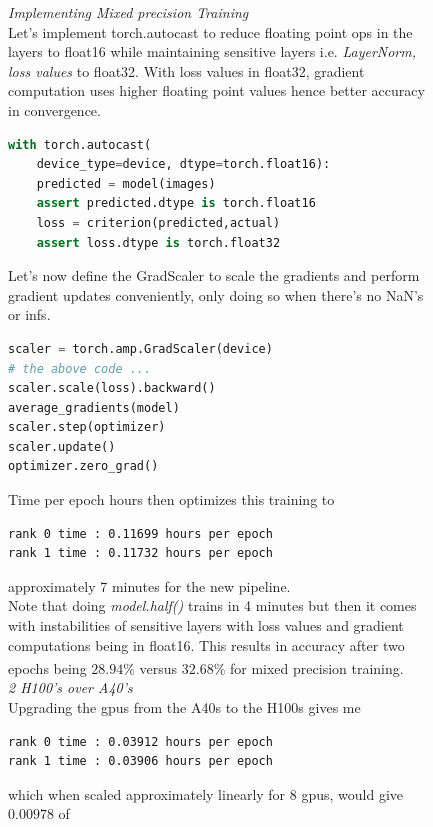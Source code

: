 \documentclass[12pt]{article}
\newcommand{\customtext}[3]{%
    \vspace{#2} %
    \fontsize{13}{8}\textcolor{#1}{\textit{#3}}%
}
\newcommand{\sidecite}[1]{\textsuperscript{\textcolor{blue}{\textbf{\scriptsize#1}}}}
\newcommand{\maincitecount}{\sidecite{\stepcounter{maincite}\themaincite}}
\begin{document}
\begin{figure}[!htb]
    \begin{minipage}[t]{0.65\textwidth}
    \customtext{xtitle}{0em}{Implementing Mixed precision Training}\\
    Let's implement {torch.autocast} to reduce floating point ops in the layers 
    to float16 while maintaining sensitive layers i.e. {\it LayerNorm, loss values} 
    to float32. With loss values in float32, gradient computation uses higher floating 
    point values hence better accuracy in convergence.
\begin{lstlisting}[language=python,style=python,basicstyle=\ttfamily\footnotesize]
with torch.autocast(
    device_type=device, dtype=torch.float16):
    predicted = model(images)
    assert predicted.dtype is torch.float16
    loss = criterion(predicted,actual)
    assert loss.dtype is torch.float32
\end{lstlisting}
Let's now define the GradScaler to scale the gradients and perform gradient updates 
conveniently, only doing so when there's no NaN's or infs.
\begin{lstlisting}[language=python,style=python,basicstyle=\ttfamily\footnotesize]
scaler = torch.amp.GradScaler(device)
# the above code ... 
scaler.scale(loss).backward()
average_gradients(model)
scaler.step(optimizer)
scaler.update()
optimizer.zero_grad()
\end{lstlisting}
Time per epoch hours then optimizes this training to 
\begin{lstlisting}[language=bash,style=bash,basicstyle=\ttfamily\footnotesize]
rank 0 time : 0.11699 hours per epoch
rank 1 time : 0.11732 hours per epoch
\end{lstlisting}
approximately 7 minutes for the new pipeline.\\
Note that doing {\it model.half()} trains in 4 minutes but then it comes with instabilities 
of sensitive layers with loss values and gradient computations being in float16. This results 
in accuracy after two epochs being $28.94 \%$ versus $32.68\%$ for mixed precision 
training.\maincitecount\\
\customtext{xtitle}{0em}{2 H100's over A40's}\\
Upgrading the gpus from the A40s to the H100s gives me 
\begin{lstlisting}[language=bash,style=bash,basicstyle=\ttfamily\footnotesize]
rank 0 time : 0.03912 hours per epoch
rank 1 time : 0.03906 hours per epoch
\end{lstlisting}
which when scaled approximately linearly for 8 gpus, would give $0.00978$ of 

\end{minipage}
\end{figure}
\end{document}
